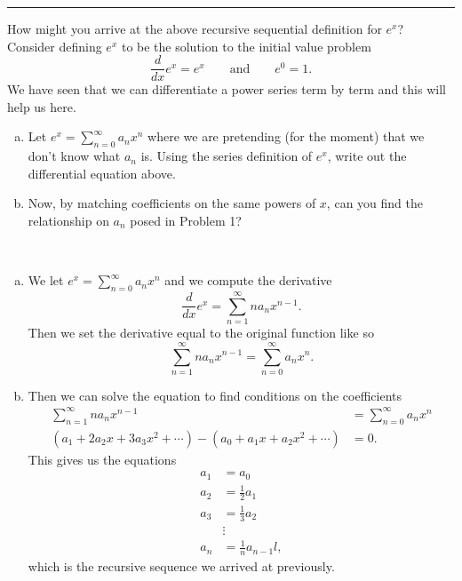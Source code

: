 \documentclass[12pt]{article} %
\begin{document}
\hrule
\begin{problem}
How might you arrive at the above recursive sequential definition for $e^x$? Consider defining $e^x$ to be the solution to the initial value problem
\[
\frac{d}{dx} e^x = e^x \qquad \textrm{and} \qquad e^0=1.
\]
We have seen that we can differentiate a power series term by term and this will help us here.
\begin{enumerate}[(a)]
    \item Let $e^x = \sum_{n=0}^\infty a_n x^n$ where we are pretending (for the moment) that we don't know what $a_n$ is.  Using the series definition of $e^x$, write out the differential equation above.
    \item Now, by matching coefficients on the same powers of $x$, can you find the relationship on $a_n$ posed in Problem 1?
\end{enumerate}
\end{problem}
\begin{solution}~
\begin{enumerate}[(a)]
    \item We let $e^x = \sum_{n=0}^\infty a_nx^n$ and we compute the derivative
    \[
    \frac{d}{dx} e^x = \sum_{n=1}^\infty na_n x^{n-1}.
    \]
    Then we set the derivative equal to the original function like so
    \[
    \sum_{n=1}^\infty na_n x^{n-1} = \sum_{n=0}^\infty a_n x^n.
    \]
    \item Then we can solve the equation to find conditions on the coefficients
    \begin{align*}
        \sum_{n=1}^\infty na_nx^{n-1} &= \sum_{n=0}^\infty a_n x^n\\
        \left( a_1 + 2a_2 x + 3a_3 x^2 + \cdots \right)-\left( a_0 +a_1 x + a_2 x^2 + \cdots \right)&=0.
    \end{align*}
    This gives us the equations
    \begin{align*}
        a_1 &= a_0\\
        a_2 &= \frac{1}{2} a_1\\
        a_3 &= \frac{1}{3} a_2\\
        &\vdots\\
        a_n &= \frac{1}{n} a_{n-1}l,
    \end{align*}
    which is the recursive sequence we arrived at previously.
\end{enumerate}
\end{solution}
\end{document}

